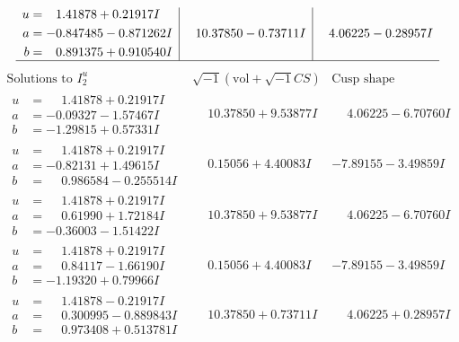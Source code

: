 \documentclass[1p]{elsarticle_modified}
\theoremstyle{definition}
\newcommand{\I}{\sqrt{-1}}
\begin{document}
$$\begin{array}{c|c|c}
\begin{aligned}
u &= \phantom{-}1.41878 + 0.21917 I \\
a &= -0.847485 - 0.871262 I \\
b &= \phantom{-}0.891375 + 0.910540 I\end{aligned}
 & \phantom{-}10.37850 - 0.73711 I & \phantom{-}4.06225 - 0.28957 I\\
 \hline 
 \end{array}$$\newpage$$\begin{array}{c|c|c}  
\text{Solutions to }I^u_{2}& \I (\text{vol} + \sqrt{-1}CS) & \text{Cusp shape}\\
 \hline 
\begin{aligned}
u &= \phantom{-}1.41878 + 0.21917 I \\
a &= -0.09327 - 1.57467 I \\
b &= -1.29815 + 0.57331 I\end{aligned}
 & \phantom{-}10.37850 + 9.53877 I & \phantom{-}4.06225 - 6.70760 I \\ \hline\begin{aligned}
u &= \phantom{-}1.41878 + 0.21917 I \\
a &= -0.82131 + 1.49615 I \\
b &= \phantom{-}0.986584 - 0.255514 I\end{aligned}
 & \phantom{-}0.15056 + 4.40083 I & -7.89155 - 3.49859 I \\ \hline\begin{aligned}
u &= \phantom{-}1.41878 + 0.21917 I \\
a &= \phantom{-}0.61990 + 1.72184 I \\
b &= -0.36003 - 1.51422 I\end{aligned}
 & \phantom{-}10.37850 + 9.53877 I & \phantom{-}4.06225 - 6.70760 I \\ \hline\begin{aligned}
u &= \phantom{-}1.41878 + 0.21917 I \\
a &= \phantom{-}0.84117 - 1.66190 I \\
b &= -1.19320 + 0.79966 I\end{aligned}
 & \phantom{-}0.15056 + 4.40083 I & -7.89155 - 3.49859 I \\ \hline\begin{aligned}
u &= \phantom{-}1.41878 - 0.21917 I \\
a &= \phantom{-}0.300995 - 0.889843 I \\
b &= \phantom{-}0.973408 + 0.513781 I\end{aligned}
 & \phantom{-}10.37850 + 0.73711 I & \phantom{-}4.06225 + 0.28957 I \\ \hline\begin{aligned}

\end{aligned}
\end{array}$$
\end{document}

